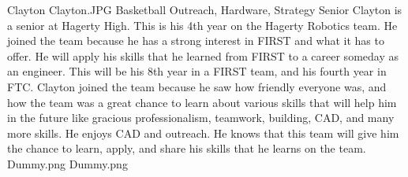 \insertbio
{Clayton}
{Clayton.JPG}
{Basketball}
{Outreach, Hardware, Strategy}
{Senior}
{
Clayton is a senior at Hagerty High. This is his 4th year on the Hagerty Robotics team. He joined the team because he has a strong interest in FIRST and what it has to offer. He will apply his skills that he learned from FIRST to a career someday as an engineer. This will be his 8th year in a FIRST team, and his fourth year in FTC. Clayton joined the team because he saw how friendly everyone was, and how the team was a great chance to learn about various skills that will help him in the future like gracious professionalism, teamwork, building, CAD, and many more skills. He enjoys CAD and outreach. He knows that this team will give him the chance to learn, apply, and share his skills that he learns on the team.
}
{Dummy.png}
{Dummy.png}
